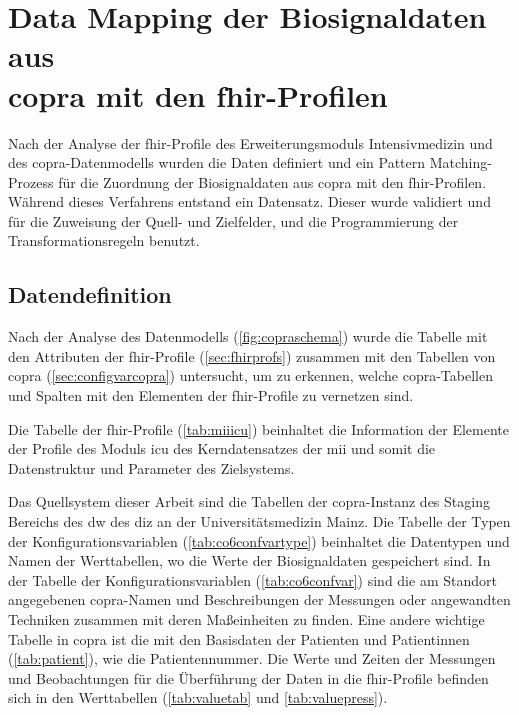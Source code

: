 \section[Data Mapping der Biosignaldaten aus \acs{copra} mit den \acs{fhir}-Profilen]{Data Mapping der Biosignaldaten aus \\ \acs{copra} mit den \acs{fhir}-Profilen} \label{sec:datamappingicucopra}

Nach der Analyse der \ac{fhir}-Profile des Erweiterungsmoduls \glqq Intensivmedizin\grqq{} und des \ac{copra}-Datenmodells wurden die Daten definiert und ein Pattern Matching-Prozess für die Zuordnung der Biosignaldaten aus \ac{copra} mit den \ac{fhir}-Profilen. Während dieses Verfahrens entstand ein Datensatz. Dieser wurde validiert und für die Zuweisung der Quell- und Zielfelder, und die Programmierung der Transformationsregeln benutzt.

\subsection{Datendefinition} \label{subsec:datadef}

Nach der Analyse des Datenmodells (\ref{fig:copraschema}) wurde die Tabelle mit den Attributen der \ac{fhir}-Profile (\ref{sec:fhirprofs}) zusammen mit den Tabellen von \ac{copra} (\ref{sec:configvarcopra}) untersucht, um zu erkennen, welche \ac{copra}-Tabellen und Spalten mit den Elementen der \ac{fhir}-Profile zu vernetzen sind.

Die Tabelle der \ac{fhir}-Profile (\ref{tab:miiicu}) beinhaltet die Information der Elemente der Profile des Moduls \glqq\ac{icu}\grqq{} des Kerndatensatzes der \ac{mii} und somit die Datenstruktur und Parameter des Zielsystems.

Das Quellsystem dieser Arbeit sind die Tabellen der \ac{copra}-Instanz des Staging Bereichs des \ac{dw} des \ac{diz} an der Universitätsmedizin Mainz. Die Tabelle der Typen der Konfigurationsvariablen (\ref{tab:co6confvartype}) beinhaltet die Datentypen und Namen der Werttabellen, wo die Werte der Biosignaldaten gespeichert sind. In der Tabelle der Konfigurationsvariablen (\ref{tab:co6confvar}) sind die am Standort angegebenen \ac{copra}-Namen und Beschreibungen der Messungen oder angewandten Techniken zusammen mit deren Maßeinheiten zu finden. Eine andere wichtige Tabelle in \ac{copra} ist die mit den Basisdaten der Patienten und Patientinnen (\ref{tab:patient}), wie die Patientennummer. Die Werte und Zeiten der Messungen und Beobachtungen für die Überführung der Daten in die \ac{fhir}-Profile befinden sich in den Werttabellen (\ref{tab:valuetab} und \ref{tab:valuepress}).

